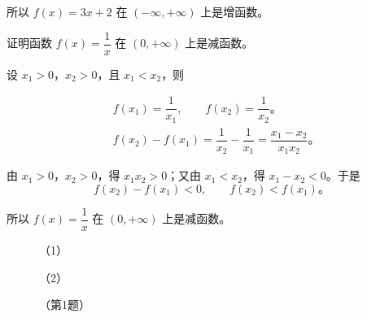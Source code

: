 所以 $f(x) = 3x + 2$ 在 $(-\infty, +\infty)$ 上是增函数。

\vspace{0.5em}
\liti 证明函数 $f(x) = \dfrac 1 x$ 在 $(0, +\infty)$ 上是减函数。
\vspace{0.5em}

\zhengming  设 $x_1 > 0$，$x_2 > 0$，且 $x_1 < x_2$，则

\begin{minipage}{10cm}
    \begin{align*}
        & f(x_1) = \dfrac 1 {x_1}, \qquad f(x_2) = \dfrac 1 {x_2} \text{。} \\
        & f(x_2) - f(x_1) = \dfrac 1 {x_2} - \dfrac 1 {x_1} = \dfrac {x_1 - x_2} {x_1x_2} \text{。}
    \end{align*}
\end{minipage}

由 $x_1 > 0$，$x_2 > 0$，得 $x_1x_2 > 0$；又由 $x_1 < x_2$，得 $x_1 - x_2 < 0$。于是
$$ f(x_2) - f(x_1) < 0, \qquad f(x_2) < f(x_1) \text{。}$$

所以 $f(x) = \dfrac 1 x$ 在 $(0, +\infty)$ 上是减函数。

\lianxi

\begin{xiaotis}


\begin{figure}[htbp]
    \centering
    \begin{minipage}{7cm}
    \centering
    
    \caption*{（1）}
    \end{minipage}
    \qquad
    \begin{minipage}{8cm}
    \centering
    
    \caption*{（2）}
    \end{minipage}
    \caption*{（第1题）}
\end{figure}


\vspace{0.5em}
\vspace{0.5em}


\end{xiaotis}
